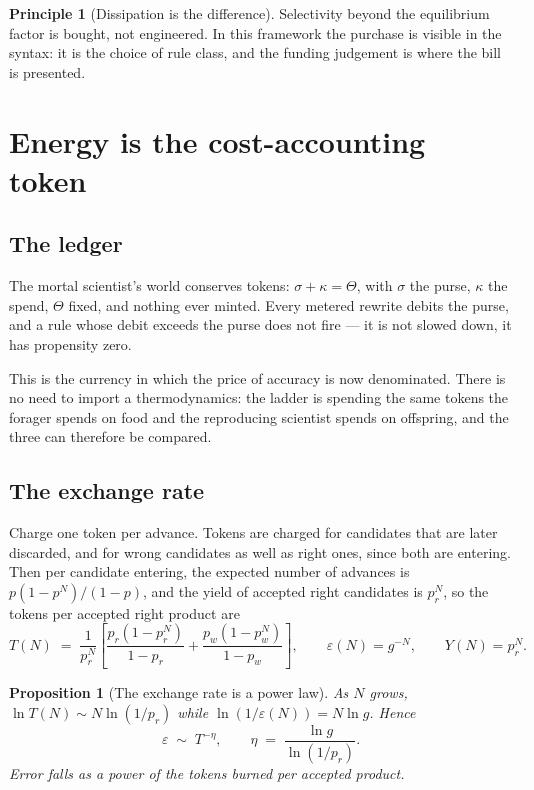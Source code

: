 \documentclass[11pt]{article}
\theoremstyle{plain}
\newtheorem{proposition}[theorem]{Proposition}
\theoremstyle{definition}
\newtheorem{principle}[theorem]{Principle}
\theoremstyle{remark}
\begin{document}
\begin{principle}[Dissipation is the difference]
Selectivity beyond the equilibrium factor is bought, not engineered. In this
framework the purchase is visible in the syntax: it is the choice of rule
class, and the funding judgement is where the bill is presented.
\end{principle}

\section{Energy is the cost-accounting token}

\subsection{The ledger}

The mortal scientist's world conserves tokens: $\sigma + \kappa = \Theta$,
with $\sigma$ the purse, $\kappa$ the spend, $\Theta$ fixed, and nothing ever
minted. Every metered rewrite debits the purse, and a rule whose debit exceeds
the purse does not fire --- it is not slowed down, it has propensity zero.

This is the currency in which the price of accuracy is now denominated. There
is no need to import a thermodynamics: the ladder is spending the same tokens
the forager spends on food and the reproducing scientist spends on offspring,
and the three can therefore be compared.

\subsection{The exchange rate}

Charge one token per advance. Tokens are charged for candidates that are later
discarded, and for wrong candidates as well as right ones, since both are
entering. Then per candidate entering, the expected number of advances is
$p(1-p^{N})/(1-p)$, and the yield of accepted right candidates is $p_r^{N}$,
so the tokens per accepted right product are
\[
T(N) \;=\; \frac{1}{p_r^{N}}
\left[\frac{p_r(1-p_r^{N})}{1-p_r} + \frac{p_w(1-p_w^{N})}{1-p_w}\right] ,
\qquad
\varepsilon(N) = g^{-N},
\qquad
Y(N) = p_r^{N} .
\]

\begin{proposition}[The exchange rate is a power law]
\label{prop:power}
As $N$ grows, $\ln T(N) \sim N\ln(1/p_r)$ while $\ln(1/\varepsilon(N)) =
N \ln g$. Hence
\[
\varepsilon \;\sim\; T^{-\eta},
\qquad
\eta \;=\; \frac{\ln g}{\ln (1/p_r)} .
\]
Error falls as a \emph{power} of the tokens burned per accepted product.
\end{proposition}
\end{document}
